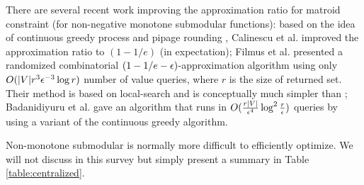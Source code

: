 There are several recent work improving the approximation ratio for matroid constraint (for non-negative monotone submodular functions): based on the idea of continuous greedy process \cite{V08} and pipage rounding \cite{AS04}, Calinescu et al. \cite{CCP+11} improved the approximation ratio to $(1 - 1/e)$ (in expectation); Filmus et al. \cite{FW14} presented a randomized combinatorial $(1 - 1/e -\epsilon)$-approximation algorithm using only $O(|V|r^3\epsilon^{-3}\log r)$ number of value queries, where $r$ is the size of returned set. Their method is based on local-search and is conceptually much simpler than \cite{CCP+11}; Badanidiyuru et al. \cite{BV14} gave an algorithm that runs in $O(\frac{r|V|}{\epsilon^4}\log^2\frac{r}{\epsilon})$ queries by using a variant of the continuous greedy algorithm.







Non-monotone submodular is normally more difficult to efficiently optimize. We will not discuss in this survey but simply present a summary in Table \ref{table:centralized}.













